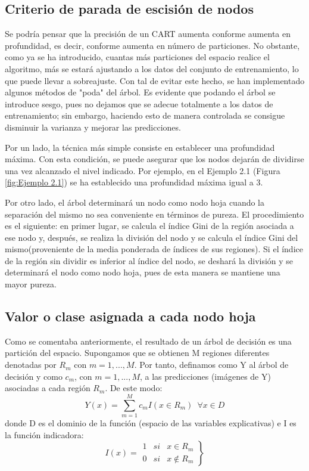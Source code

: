 \documentclass[12pt,twoside]{article}
\begin{document}
\subsection{Criterio de parada de escisión de nodos}
Se podría pensar que la precisión de un CART aumenta conforme aumenta en profundidad, es decir, conforme aumenta en número de particiones. No obstante, como ya se ha introducido, cuantas más particiones del espacio realice el algoritmo, más se estará ajustando a los datos del conjunto de entrenamiento, lo que puede llevar a sobreajuste. Con tal de evitar este hecho, se han implementado algunos métodos de "poda" del árbol. Es evidente que podando el árbol se introduce sesgo, pues no dejamos que se adecue totalmente a los datos de entrenamiento; sin embargo, haciendo esto de manera controlada se consigue disminuir la varianza y mejorar las predicciones.

Por un lado, la técnica más simple consiste en establecer una profundidad máxima. Con esta condición, se puede asegurar que los nodos dejarán de dividirse una vez alcanzado el nivel indicado. Por ejemplo, en el Ejemplo 2.1 (Figura \ref{fig:Ejemplo 2.1}) se ha establecido una profundidad máxima igual a 3.

Por otro lado, el árbol determinará un nodo como nodo hoja cuando la separación del mismo no sea conveniente en términos de pureza. El procedimiento es el siguiente: en primer lugar, se calcula el índice Gini de la región asociada a ese nodo y, después, se realiza la división del nodo y se calcula el índice Gini del mismo(proveniente de la media ponderada de índices de sus regiones). Si el índice de la región sin dividir es inferior al índice del nodo, se deshará la división y se determinará el nodo como nodo hoja, pues de esta manera se mantiene una mayor pureza.


\subsection{Valor o clase asignada a cada nodo hoja}
Como se comentaba anteriormente, el resultado de un árbol de decisión es una partición del espacio. Supongamos que se obtienen M regiones diferentes denotadas por $R_{m}$ con $m = 1, ..., M$. Por tanto, definamos como Y al árbol de decisión y como $c_m$, con $m = 1,...,M$, a las predicciones (imágenes de Y) asociadas a cada región $R_m$. De este modo:
\begin{equation*}
Y(x) = \sum^M_{m = 1} c_{m}I(x \in R_m) \, \, \, \forall x \in D
\end{equation*}
donde D es el dominio de la función (espacio de las variables explicativas) e I es la función indicadora:
\begin{equation*}
I(x) = 
\left.
\begin{array}{ccc}
1 & si & x \in R_m \\
0 & si & x \not\in R_m 
\end{array}
\right\}
\end{equation*}
\end{document}
